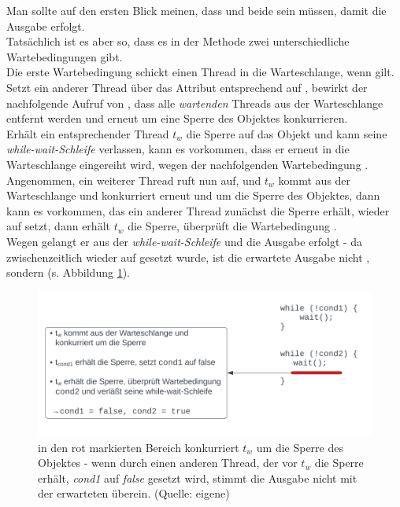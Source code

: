 Man sollte auf den ersten Blick meinen, dass  und  beide  sein müssen, damit die Ausgabe erfolgt.\\
Tatsächlich ist es aber so, dass es in der Methode zwei unterschiedliche Wartebedingungen gibt.\\
Die erste Wartebedingung schickt einen Thread in die Warteschlange, wenn  gilt.\\
Setzt ein anderer Thread über  das Attribut entsprechend auf , bewirkt der nachfolgende Aufruf von , dass alle \textit{wartenden} Threads aus der Warteschlange entfernt werden und erneut um eine Sperre des Objektes konkurrieren.\\
Erhält ein entsprechender Thread $t_w$ die Sperre auf das Objekt und kann seine \textit{while-wait-Schleife} verlassen, kann es vorkommen, dass er erneut in die Warteschlange eingereiht wird, wegen der nachfolgenden Wartebedingung .\\
Angenommen, ein weiterer Thread ruft nun  auf, und $t_w$ kommt aus der Warteschlange und konkurriert erneut und um die Sperre des Objektes, dann kann es vorkommen, das ein anderer Thread zunächst die Sperre erhält,  wieder auf  setzt, dann erhält $t_w$ die Sperre, überprüft die Wartebedingung .\\
Wegen  gelangt er aus der \textit{while-wait-Schleife} und die Ausgabe erfolgt - da zwischenzeitlich  wieder auf  gesetzt wurde, ist die erwartete Ausgabe nicht , sondern  (s. Abbildung \ref{fig:cond1cond2}).\\

\begin{figure}
    \centering
    \includegraphics[scale=0.4]{chapters/Anhang/Klausuren/img/cond1cond2}
    \caption{in den rot markierten Bereich konkurriert $t_w$ um die Sperre des Objektes - wenn durch einen anderen Thread, der vor $t_w$ die Sperre erhält, \textit{cond1} auf \textit{false} gesetzt wird, stimmt die Ausgabe nicht mit der erwarteten überein. (Quelle: eigene)}
    \label{fig:cond1cond2}
\end{figure}

